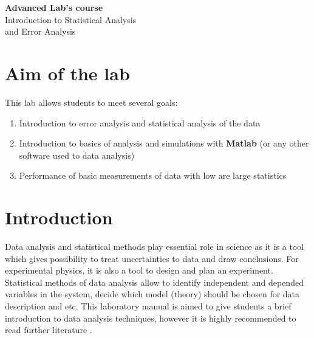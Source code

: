 \documentclass[12pt,a4paper]{report}
\begin{document}
\begin{center}
{\bf Advanced Lab's course} \\ %
Introduction to Statistical Analysis \\
and Error Analysis \\
\end{center}


\section{Aim of the lab}
This lab allows students to meet several goals:
\begin{enumerate}
\item Introduction to error analysis and statistical analysis of the data
\item Introduction to basics of analysis and simulations with \textbf{Matlab} (or any other software used to data analysis)
\item Performance of basic measurements of data with low are large statistics
\end{enumerate}


\section{Introduction}
Data analysis and statistical methods play essential role in science as it is a tool which gives possibility to treat uncertainties to data and draw conclusions. For experimental physics, it is also a tool to design and plan an experiment. Statistical methods of data analysis allow to identify independent and depended variables in the system, decide which model (theory) should be chosen for data description and etc. This laboratory manual is aimed to give students a brief introduction to data analysis techniques, however it is highly recommended to read further literature \cite{stat_1, stat_2, stat_3}.
\end{document}
